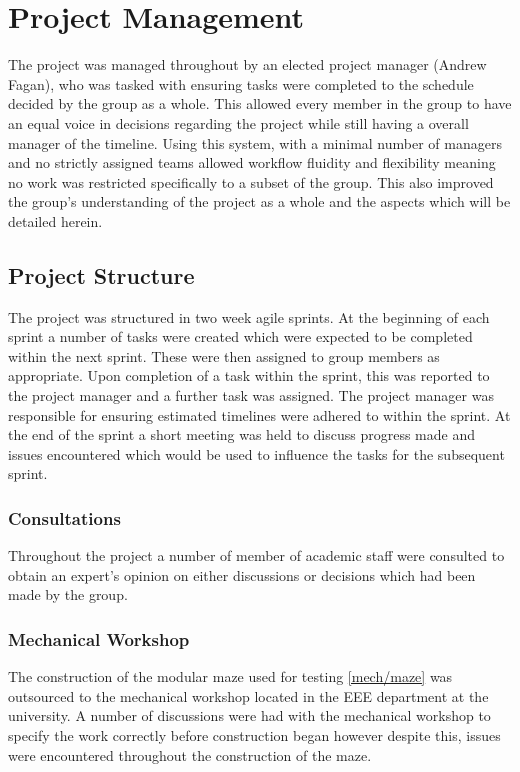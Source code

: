 \chapter{Project Management}\label{pm}

The project was managed throughout by an elected project manager (Andrew Fagan), who was tasked with ensuring tasks were completed to the schedule decided by the group as a whole. This allowed every member in the group to have an equal voice in decisions regarding the project while still having a overall manager of the timeline. Using this system, with a minimal number of managers and no strictly assigned teams allowed workflow fluidity and flexibility meaning no work was restricted specifically to a subset of the group. This also improved the group's understanding of the project as a whole and the aspects which will be detailed herein. 

\section{Project Structure}\label{pm/structure}

The project was structured in two week agile sprints. At the beginning of each sprint a number of tasks were created which were expected to be completed within the next sprint. These were then assigned to group members as appropriate. Upon completion of a task within the sprint, this was reported to the project manager and a further task was assigned. The project manager was responsible for ensuring estimated timelines were adhered to within the sprint. At the end of the sprint a short meeting was held to discuss progress made and issues encountered which would be used to influence the tasks for the subsequent sprint. 
	

\subsection{Consultations}\label{pm/consultations}
Throughout the project a number of member of academic staff were consulted to obtain an expert's opinion on either discussions or decisions which had been made by the group. 

\subsection{Mechanical Workshop}\label{pm/mechshop}
The construction of the modular maze used for testing \ref{mech/maze} was outsourced to the mechanical workshop located in the EEE department at the university. A number of discussions were had with the mechanical workshop to specify the work correctly before construction began however despite this, issues were encountered throughout the construction of the maze. 

